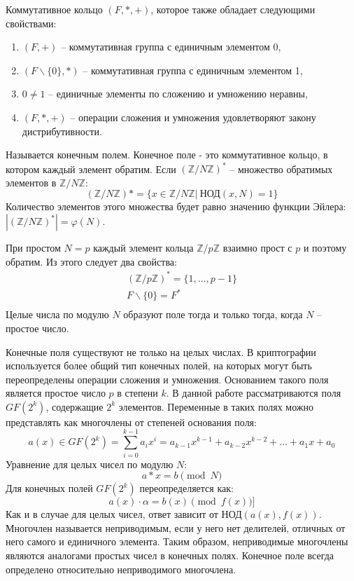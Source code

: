 \documentclass[times,specification,annotation]{itmo-student-thesis}
\begin{document}
Коммутативное кольцо $(F,*,+)$, которое также обладает следующими свойствами:
\begin{enumerate}[label=\arabic*.]
    \item $(F,+)$ -- коммутативная группа с единичным элементом 0,
    \item $(F \backslash \{0\},*)$ -- коммутативная группа с единичным элементом 1,
    \item $0\neq1$ -- единичные элементы по сложению и умножению неравны,
    \item $(F,*,+)$ -- операции сложения и умножения удовлетворяют закону дистрибутивности.
\end{enumerate}
Называется конечным полем.
Конечное поле - это коммутативное кольцо, в котором каждый элемент обратим.
Если $(\mathbb{Z}/N\mathbb{Z})^*$ -- множество обратимых элементов в $\mathbb{Z}/N\mathbb{Z}$:
\[(\mathbb{Z}/N\mathbb{Z})* = \{x \in \mathbb{Z}/N\mathbb{Z} | ~ \text{НОД}(x, N) = 1\}\]
Количество элементов этого множества будет равно значению функции Эйлера:
$|(\mathbb{Z}/N\mathbb{Z})^*| = \varphi (N)$.

При простом $N=p$ каждый элемент кольца $\mathbb{Z}/p\mathbb{Z}$ взаимно прост с $p$ и поэтому обратим.
Из этого следует два свойства:
\begin{gather*}
    (\mathbb{Z}/p\mathbb{Z})^* = \{1, \dots, p-1\}\\
    F \backslash \{0\} = F^*\\
\end{gather*}
Целые числа по модулю $N$ образуют поле тогда и только тогда, когда $N$ -- простое число.

Конечные поля существуют не только на целых числах.
В криптографии используется более общий тип конечных полей, на которых могут быть переопределены операции сложения и умножения.
Основанием такого поля является простое число $p$ в степени $k$.
В данной работе рассматриваются поля $GF (2^k)$, содержащие $2^k$ элементов.
Переменные в таких полях можно представлять как многочлены от степеней основания поля:
\[a(x) \in GF(2^k) = \sum_{i=0}^{k-1}a_i x^i = a_{k-1}x^{k-1} + a_{k-2}x^{k-2} + \dots + a_1 x + a_0\]
Уравнение для целых чисел по модулю $N$:
\[a*x = b \pmod{N}\]
Для конечных полей $GF(2^k)$ переопределяется как:
\[a(x) \cdot \alpha = b(x) \pmod{f(x)}]\]
Как и в случае для целых чисел, ответ зависит от НОД$(a(x), f(x))$.
Многочлен называется неприводимым, если у него нет делителей, отличных от него самого и единичного элемента.
Таким образом, неприводимые многочлены являются аналогами простых чисел в конечных полях.
Конечное поле всегда определено относительно неприводимого многочлена.
\end{document}

